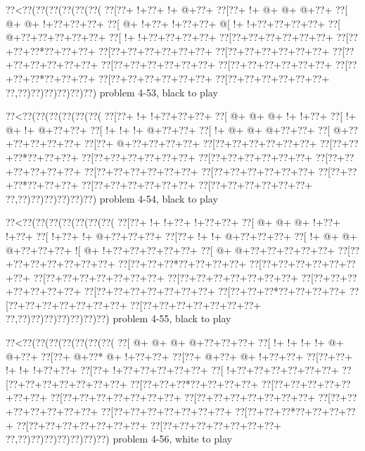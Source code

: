 \vbox{\vbox{\goo
\0??<\0??(\0??(\0??(\0??(\0??(\0??(
\0??[\0??+\- !+\0??+\- !+\- @+\0??+
\0??[\0??+\- !+\- @+\- @+\- @+\0??+
\0??[\- @+\- @+\- !+\0??+\0??+\0??+
\0??[\- @+\- !+\0??+\- !+\0??+\0??+
\- @[\- !+\- !+\0??+\0??+\0??+\0??+
\0??[\- @+\0??+\0??+\0??+\0??+\0??+
\0??[\- !+\- !+\0??+\0??+\0??+\0??+
\0??[\0??+\0??+\0??+\0??+\0??+\0??+
\0??[\0??+\0??+\0??*\0??+\0??+\0??+
\0??[\0??+\0??+\0??+\0??+\0??+\0??+
\0??[\0??+\0??+\0??+\0??+\0??+\0??+
\0??[\0??+\0??+\0??+\0??+\0??+\0??+
\0??[\0??+\0??+\0??+\0??+\0??+\0??+
\0??[\0??+\0??+\0??+\0??+\0??+\0??+
\0??[\0??+\0??+\0??*\0??+\0??+\0??+
\0??[\0??+\0??+\0??+\0??+\0??+\0??+
\0??[\0??+\0??+\0??+\0??+\0??+\0??+
\0??,\0??)\0??)\0??)\0??)\0??)\0??)
}
\hfil problem 4-53, black to play\hfil\break
}

\vbox{\vbox{\goo
\0??<\0??(\0??(\0??(\0??(\0??(\0??(
\0??[\0??+\- !+\- !+\0??+\0??+\0??+
\0??[\- @+\- @+\- @+\- !+\- !+\0??+
\0??[\- !+\- @+\- !+\- @+\0??+\0??+
\0??[\- !+\- !+\- !+\- @+\0??+\0??+
\0??[\- !+\- @+\- @+\- @+\0??+\0??+
\0??[\- @+\0??+\0??+\0??+\0??+\0??+
\0??[\0??+\- @+\0??+\0??+\0??+\0??+
\0??[\0??+\0??+\0??+\0??+\0??+\0??+
\0??[\0??+\0??+\0??*\0??+\0??+\0??+
\0??[\0??+\0??+\0??+\0??+\0??+\0??+
\0??[\0??+\0??+\0??+\0??+\0??+\0??+
\0??[\0??+\0??+\0??+\0??+\0??+\0??+
\0??[\0??+\0??+\0??+\0??+\0??+\0??+
\0??[\0??+\0??+\0??+\0??+\0??+\0??+
\0??[\0??+\0??+\0??*\0??+\0??+\0??+
\0??[\0??+\0??+\0??+\0??+\0??+\0??+
\0??[\0??+\0??+\0??+\0??+\0??+\0??+
\0??,\0??)\0??)\0??)\0??)\0??)\0??)
}
\hfil problem 4-54, black to play\hfil\break
}

\vbox{\vbox{\goo
\0??<\0??(\0??(\0??(\0??(\0??(\0??(\0??(
\0??[\0??+\- !+\- !+\0??+\- !+\0??+\0??+
\0??[\- @+\- @+\- @+\- !+\0??+\- !+\0??+
\0??[\- !+\0??+\- !+\- @+\0??+\0??+\0??+
\0??[\0??+\- !+\- !+\- @+\0??+\0??+\0??+
\0??[\- !+\- @+\- @+\- @+\0??+\0??+\0??+
\- ![\- @+\- !+\0??+\0??+\0??+\0??+\0??+
\0??[\- @+\- @+\0??+\0??+\0??+\0??+\0??+
\0??[\0??+\0??+\0??+\0??+\0??+\0??+\0??+
\0??[\0??+\0??+\0??*\0??+\0??+\0??+\0??+
\0??[\0??+\0??+\0??+\0??+\0??+\0??+\0??+
\0??[\0??+\0??+\0??+\0??+\0??+\0??+\0??+
\0??[\0??+\0??+\0??+\0??+\0??+\0??+\0??+
\0??[\0??+\0??+\0??+\0??+\0??+\0??+\0??+
\0??[\0??+\0??+\0??+\0??+\0??+\0??+\0??+
\0??[\0??+\0??+\0??*\0??+\0??+\0??+\0??+
\0??[\0??+\0??+\0??+\0??+\0??+\0??+\0??+
\0??[\0??+\0??+\0??+\0??+\0??+\0??+\0??+
\0??,\0??)\0??)\0??)\0??)\0??)\0??)\0??)
}
\hfil problem 4-55, black to play\hfil\break
}

\vbox{\vbox{\goo
\0??<\0??(\0??(\0??(\0??(\0??(\0??(\0??(
\0??[\- @+\- @+\- @+\- @+\0??+\0??+\0??+
\0??[\- !+\- !+\- !+\- !+\- @+\- @+\0??+
\0??[\0??+\- @+\0??*\- @+\- !+\0??+\0??+
\0??[\0??+\- @+\0??+\- @+\- !+\0??+\0??+
\0??[\0??+\0??+\- !+\- !+\- !+\0??+\0??+
\0??[\0??+\- !+\0??+\0??+\0??+\0??+\0??+
\0??[\- !+\0??+\0??+\0??+\0??+\0??+\0??+
\0??[\0??+\0??+\0??+\0??+\0??+\0??+\0??+
\0??[\0??+\0??+\0??*\0??+\0??+\0??+\0??+
\0??[\0??+\0??+\0??+\0??+\0??+\0??+\0??+
\0??[\0??+\0??+\0??+\0??+\0??+\0??+\0??+
\0??[\0??+\0??+\0??+\0??+\0??+\0??+\0??+
\0??[\0??+\0??+\0??+\0??+\0??+\0??+\0??+
\0??[\0??+\0??+\0??+\0??+\0??+\0??+\0??+
\0??[\0??+\0??+\0??*\0??+\0??+\0??+\0??+
\0??[\0??+\0??+\0??+\0??+\0??+\0??+\0??+
\0??[\0??+\0??+\0??+\0??+\0??+\0??+\0??+
\0??,\0??)\0??)\0??)\0??)\0??)\0??)\0??)
}
\hfil problem 4-56, white to play\hfil\break
}

